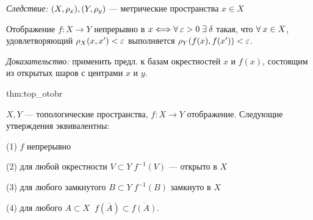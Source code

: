 \documentclass[../../main.tex]{subfiles}
\begin{document}
\textit{Следствие:} $(X, \rho_x), (Y, \rho_y)$ — метрические пространства $x \in X$

Отображение $f \colon X \to Y$ непрерывно в $x \Longleftrightarrow \forall\: \varepsilon > 0 \; \exists\: \delta$ такая, что $\forall\: x \in X$, удовлетворяющий $\rho_X(x, x') < \varepsilon$ выполняется $\rho_Y(f(x), f(x')) < \varepsilon$.

\textit{Доказательство:} применить предл. к базам окрестностей $x$ и $f(x)$, состоящим из открытых шаров с центрами $x$ и $y$.

\begin{theo}[]{thm:top_otobr}

$X, Y$ — топологические пространства, $f \colon X \to Y$ отображение. Следующие утверждения эквивалентны:

(1) $f$ непрерывно

(2) для любой окрестности $V \subset Y \; f^{-1}(V)$ — открыто в $X$

(3) для любого замкнутого $B \subset Y \; f^{-1}(B)$ замкнуто в $X$

(4) для любого $A \subset X \;\; f(\overline{A}) \subset \overline{f(A)}$.

\end{theo}
\end{document}
